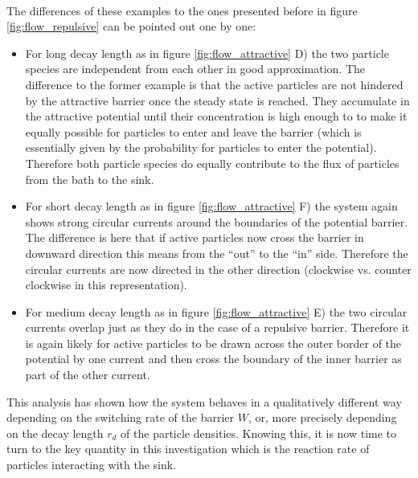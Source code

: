 \vspace{.5 cm} \\
The differences of these examples to the ones presented before in figure \ref{fig:flow_repulsive} can be pointed out one by one:
\begin{itemize}
    \item For long decay length as in figure \ref{fig:flow_attractive} D) the two particle species are independent from each other in good approximation. The difference to the former example is that the active particles are not hindered by the attractive barrier once the steady state is reached. They accumulate in the attractive potential until their concentration is high enough to to make it equally possible for particles to enter and leave the barrier (which is essentially given by the probability for particles to enter the potential). Therefore both particle species do equally contribute to the flux of particles from the bath to the sink.
    \item For short decay length as in figure \ref{fig:flow_attractive} F) the system again shows strong circular currents around the boundaries of the potential barrier. The difference is here that if active particles now cross the barrier in downward direction this means from the ``out'' to the ``in'' side. Therefore the circular currents are now directed in the other direction (clockwise vs. counter clockwise in this representation).
    \item For medium decay length as in figure \ref{fig:flow_attractive} E)  the two circular currents overlap just as they do in the case of a repulsive barrier. Therefore it is again likely for active particles to be drawn across the outer border of the potential by one current and then cross the boundary of the inner barrier as part of the other current.
\end{itemize}
This analysis has shown how the system behaves in a qualitatively different way depending on the switching rate of the barrier $W$, or, more precisely depending on the decay length $r_d$ of the particle densities. Knowing this, it is now time to turn to the key quantity in this investigation which is the reaction rate of particles interacting with the sink. 
